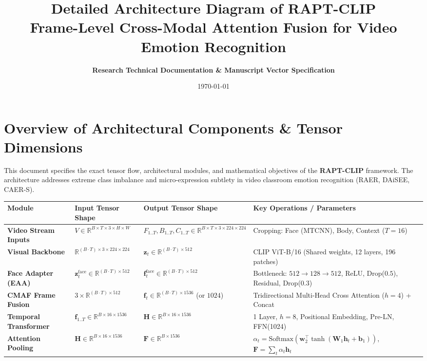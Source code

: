 \documentclass[11pt,a4paper]{article}
\title{\Large\bfseries Detailed Architecture Diagram of RAPT-CLIP\\
\large Frame-Level Cross-Modal Attention Fusion for Video Emotion Recognition}
\author{\textbf{Research Technical Documentation \& Manuscript Vector Specification}}
\date{\today}
\begin{document}
\maketitle

\section*{Overview of Architectural Components \& Tensor Dimensions}
This document specifies the exact tensor flow, architectural modules, and mathematical objectives of the \textbf{RAPT-CLIP} framework. The architecture addresses extreme class imbalance and micro-expression subtlety in video classroom emotion recognition (RAER, DAiSEE, CAER-S).

\begin{table}[h!]
\centering
\small
\renewcommand{\arraystretch}{1.2}
\begin{tabular}{@{}llll@{}}
\toprule
\textbf{Module} & \textbf{Input Tensor Shape} & \textbf{Output Tensor Shape} & \textbf{Key Operations / Parameters} \\
\midrule
\textbf{Video Stream Inputs} & $V \in \mathbb{R}^{B \times T \times 3 \times H \times W}$ & $F_{1..T}, B_{1..T}, C_{1..T} \in \mathbb{R}^{B \times T \times 3 \times 224 \times 224}$ & Cropping: Face (MTCNN), Body, Context ($T=16$) \\
\textbf{Visual Backbone} & $\mathbb{R}^{(B \cdot T) \times 3 \times 224 \times 224}$ & $\mathbf{z}_t \in \mathbb{R}^{(B \cdot T) \times 512}$ & CLIP ViT-B/16 (Shared weights, 12 layers, 196 patches) \\
\textbf{Face Adapter (EAA)} & $\mathbf{z}_t^{\text{face}} \in \mathbb{R}^{(B \cdot T) \times 512}$ & $\mathbf{f}_t^{\text{face}} \in \mathbb{R}^{(B \cdot T) \times 512}$ & Bottleneck: $512 \!\rightarrow\! 128 \!\rightarrow\! 512$, ReLU, Drop($0.5$), Residual, Drop($0.3$) \\
\textbf{CMAF Frame Fusion} & $3 \times \mathbb{R}^{(B \cdot T) \times 512}$ & $\mathbf{f}_t \in \mathbb{R}^{(B \cdot T) \times 1536}$ (or $1024$) & Tridirectional Multi-Head Cross Attention ($h=4$) + Concat \\
\textbf{Temporal Transformer} & $\mathbf{f}_{1..T} \in \mathbb{R}^{B \times 16 \times 1536}$ & $\mathbf{H} \in \mathbb{R}^{B \times 16 \times 1536}$ & 1 Layer, $h=8$, Positional Embedding, Pre-LN, FFN(1024) \\
\textbf{Attention Pooling} & $\mathbf{H} \in \mathbb{R}^{B \times 16 \times 1536}$ & $\mathbf{F} \in \mathbb{R}^{B \times 1536}$ & $\alpha_t = \text{Softmax}(\mathbf{w}_2^\top \tanh(\mathbf{W}_1 \mathbf{h}_t + \mathbf{b}_1))$, $\mathbf{F} = \sum_{t} \alpha_t \mathbf{h}_t$ \\

\end{tabular}
\end{table}
\end{document}
